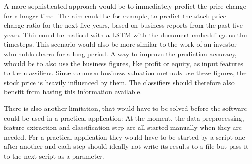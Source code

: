 A more sophisticated approach would be to immediately predict the price change for a longer time.
The aim could be for example, to predict the stock price change ratio for the next five years, based on business reports from the past five years.
This could be realised with a \ac{LSTM} with the document embeddings as the timesteps.
This scenario would also be more similar to the work of an investor who holds shares for a long period.
A way to improve the prediction accuracy, whould be to also use the business figures, like profit or equity, as input features to the classifiers.
Since common business valuation methods use these figures, the stock price is heavily influenced by them.
The classifiers should therefore also benefit from having this information available.



There is also another limitation, that would have to be solved before the software could be used in a practical application:
At the moment, the data preprocessing, feature extraction and classification step are all started manually when they are needed.
For a practical application they would have to be started by a script one after another and each step should ideally not write its results to a file but pass it to the next script as a parameter.


